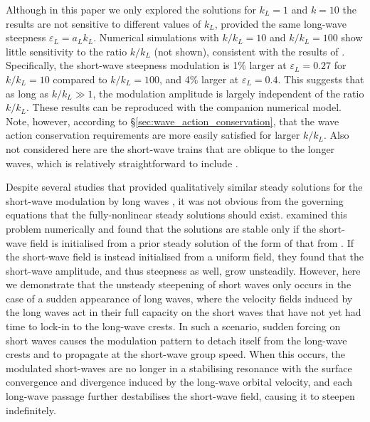 \documentclass[lineno]{jfm}
\begin{document}
Although in this paper we only explored the solutions for $k_L = 1$ and $k=10$
the results are not sensitive to different values of $k_L$, provided the same
long-wave steepness $\varepsilon_L = a_L k_L$.
Numerical simulations with $k/k_L = 10$ and $k/k_L = 100$ show little
sensitivity to the ratio $k/k_L$ (not shown), consistent with the results of
\citet{longuet1987propagation}.
Specifically, the short-wave steepness modulation is 1\% larger at
$\varepsilon_L = 0.27$ for $k/k_L = 10$ compared to $k/k_L = 100$, and 4\%
larger at $\varepsilon_L = 0.4$.
This suggests that as long as $k/k_L \gg 1$, the modulation amplitude is
largely independent of the ratio $k/k_L$.
These results can be reproduced with the companion numerical model.
Note, however, according to \S\ref{sec:wave_action_conservation}, that the
wave action conservation requirements are more easily satisfied for larger
$k/k_L$.
Also not considered here are the short-wave trains that are oblique to the
longer waves, which is relatively straightforward to include
\citep{peureux2021unsteady}.

Despite several studies that provided qualitatively similar steady solutions
for the short-wave modulation by long waves
\citep{longuet1960changes,phillips1981dispersion,longuet1987propagation,henyey1988energy,zhang1990evolution},
it was not obvious from the governing equations that the fully-nonlinear
steady solutions should exist.
\citet{peureux2021unsteady} examined this problem numerically and found that
the solutions are stable only if the short-wave field is initialised from
a prior steady solution of the form of that from \citet{longuet1960changes}.
If the short-wave field is instead initialised from a uniform field, they
found that the short-wave amplitude, and thus steepness as well, grow
unsteadily.
However, here we demonstrate that the unsteady steepening of short
waves only occurs in the case of a sudden appearance of long waves, where
the velocity fields induced by the long waves act in their full capacity
on the short waves that have not yet had time to lock-in to the long-wave
crests.
In such a scenario, sudden forcing on short waves causes the modulation
pattern to detach itself from the long-wave crests and to propagate at the
short-wave group speed.
When this occurs, the modulated short-waves are no longer in a stabilising
resonance with the surface convergence and divergence induced by the long-wave
orbital velocity, and each long-wave passage further destabilises the short-wave
field, causing it to steepen indefinitely.
\end{document}
